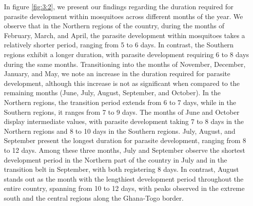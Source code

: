 \documentclass[utf8]{FrontiersinHarvard} %
\begin{document}
In figure \ref{fig:3:2}, we present our findings regarding the duration required for parasite development within mosquitoes across different months of the year. We observe that in the Northern regions of the country, during the months of February, March, and April, the parasite development within mosquitoes takes a relatively shorter period, ranging from 5 to 6 days. In contrast, the Southern regions exhibit a longer duration, with parasite development requiring 6 to 8 days during the same months. Transitioning into the months of November, December, January, and May, we note an increase in the duration required for parasite development, although this increase is not as significant when compared to the remaining months (June, July, August, September, and October). In the Northern regions, the transition period extends from 6 to 7 days, while in the Southern regions, it ranges from 7 to 9 days. The months of June and October display intermediate values, with parasite development taking 7 to 8 days in the Northern regions and 8 to 10 days in the Southern regions. July, August, and September present the longest duration for parasite development, ranging from 8 to 12 days. Among these three months, July and September observe the shortest development period in the Northern part of the country in July and in the transition belt in September, with both registering 8 days. In contrast, August stands out as the month with the lengthiest development period throughout the entire country, spanning from 10 to 12 days, with peaks observed in the extreme south and the central regions along the Ghana-Togo border.
\end{document}
